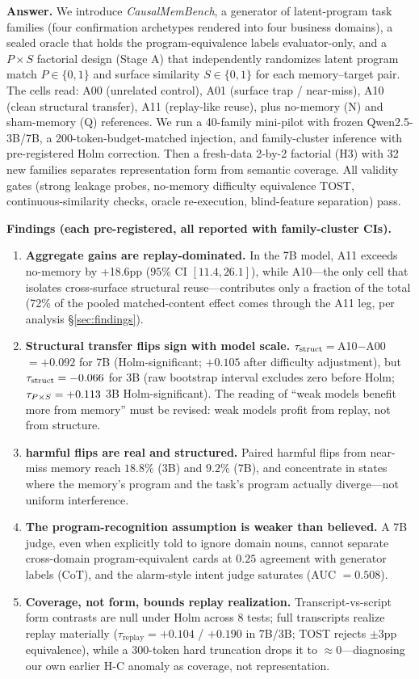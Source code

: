 \textbf{Answer.} We introduce \emph{CausalMemBench}, a generator of latent-program task families (four confirmation archetypes rendered into four business domains), a sealed oracle that holds the program-equivalence labels evaluator-only, and a $P\times S$ factorial design (Stage A) that independently randomizes latent program match $P\in\{0,1\}$ and surface similarity $S\in\{0,1\}$ for each memory--target pair. The cells read: A00 (unrelated control), A01 (surface trap / near-miss), A10 (clean structural transfer), A11 (replay-like reuse), plus no-memory (N) and sham-memory (Q) references. We run a 40-family mini-pilot with frozen Qwen2.5-3B/7B, a 200-token-budget-matched injection, and family-cluster inference with pre-registered Holm correction. Then a fresh-data 2-by-2 factorial (H3) with 32 new families separates representation form from semantic coverage. All validity gates (strong leakage probes, no-memory difficulty equivalence TOST, continuous-similarity checks, oracle re-execution, blind-feature separation) pass.

\textbf{Findings (each pre-registered, all reported with family-cluster CIs).}
\begin{enumerate}[leftmargin=1.6em]
  \item \textbf{Aggregate gains are replay-dominated.} In the 7B model, A11 exceeds no-memory by +18.6pp ($95\%$ CI $[11.4, 26.1]$), while A10---the only cell that isolates cross-surface structural reuse---contributes only a fraction of the total (72\% of the pooled matched-content effect comes through the A11 leg, per analysis \S\ref{sec:findings}).
  \item \textbf{Structural transfer flips sign with model scale.} $\tau_{\mathrm{struct}}=\,$A10$-$A00 $=+0.092$ for 7B (Holm-significant; $+0.105$ after difficulty adjustment), but $\tau_{\mathrm{struct}}=-0.066$ for 3B (raw bootstrap interval excludes zero before Holm; $\tau_{P\times S}=+0.113$ 3B Holm-significant). The reading of ``weak models benefit more from memory'' \citep{feng2026transplants} must be revised: weak models profit from replay, not from structure.
  \item \textbf{harmful flips are real and structured.} Paired harmful flips from near-miss memory reach $18.8\%$ (3B) and $9.2\%$ (7B), and concentrate in states where the memory's program and the task's program actually diverge---not uniform interference.
  \item \textbf{The program-recognition assumption is weaker than believed.} A 7B judge, even when explicitly told to ignore domain nouns, cannot separate cross-domain program-equivalent cards at $0.25$ agreement with generator labels (CoT), and the alarm-style intent judge saturates (AUC $=0.508$).
  \item \textbf{Coverage, not form, bounds replay realization.} Transcript-vs-script form contrasts are null under Holm across 8 tests; full transcripts realize replay materially ($\tau_{\mathrm{replay}} = +0.104$ / $+0.190$ in 7B/3B; TOST rejects $\pm3$pp equivalence), while a 300-token hard truncation drops it to $\approx 0$---diagnosing our own earlier H-C anomaly as coverage, not representation.
\end{enumerate}

